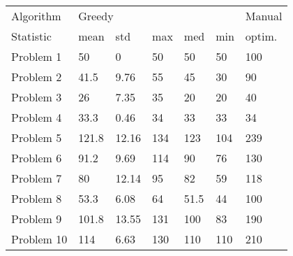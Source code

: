 \begin{tabular}{lllllll}
\toprule
Algorithm & \multicolumn{5}{l}{Greedy} & Manual \\
Statistic &   mean &    std &  max &   med &  min & optim. \\
\midrule
Problem 1  &     50 &      0 &   50 &    50 &   50 &    100 \\
Problem 2  &   41.5 &   9.76 &   55 &    45 &   30 &     90 \\
Problem 3  &     26 &   7.35 &   35 &    20 &   20 &     40 \\
Problem 4  &   33.3 &   0.46 &   34 &    33 &   33 &     34 \\
Problem 5  &  121.8 &  12.16 &  134 &   123 &  104 &    239 \\
Problem 6  &   91.2 &   9.69 &  114 &    90 &   76 &    130 \\
Problem 7  &     80 &  12.14 &   95 &    82 &   59 &    118 \\
Problem 8  &   53.3 &   6.08 &   64 &  51.5 &   44 &    100 \\
Problem 9  &  101.8 &  13.55 &  131 &   100 &   83 &    190 \\
Problem 10 &    114 &   6.63 &  130 &   110 &  110 &    210 \\
\bottomrule
\end{tabular}

